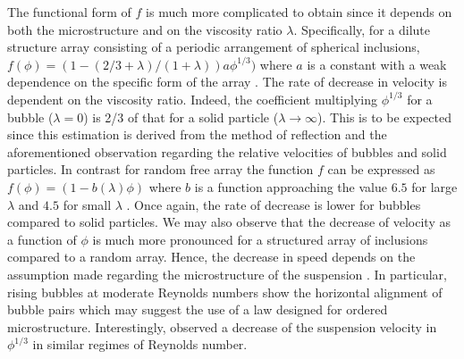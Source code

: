 The functional form of $f$ is much more complicated to obtain since it depends on both the microstructure and on the viscosity ratio $\lambda$. 
Specifically, for a dilute structure array consisting of a periodic arrangement of spherical inclusions, $f(\phi) =(1 - (2/3+\lambda)/(1+\lambda))a\phi^{1/3})$ where $a$ is a constant with a weak dependence on the specific form of the array \citep{sangani1987}. 
The rate of decrease in velocity is dependent on the viscosity ratio. 
Indeed, the coefficient multiplying $\phi^{1/3}$ for a bubble ($\lambda=0$) is 2/3 of that for a solid particle ($\lambda \to \infty$). 
This is to be expected since this estimation is derived from the method of reflection and the aforementioned observation regarding the relative velocities of bubbles and solid particles. In contrast for random free array the function $f$ can be expressed as  $f(\phi) = (1-b(\lambda)\phi)$ where $b$ is a function approaching the value $6.5$ for large $\lambda$ and $4.5$ for small $\lambda$ \citep{wacholder1973,haber1981}. 
Once again, the rate of decrease is lower for bubbles compared to solid particles. 
We may also observe that the decrease of velocity as a function of $\phi$ is much more pronounced for a structured array of inclusions compared to a random array. 
Hence, the decrease in speed depends on the assumption made regarding the microstructure of the suspension \citep{davis1985}. In particular, rising bubbles at moderate Reynolds numbers show the horizontal alignment of bubble pairs \citep{bunner2002dynamics,yin2006} which may suggest the use of a law designed for ordered microstructure. 
Interestingly, \citet{loisy2017} observed a decrease of the suspension velocity in $\phi^{1/3}$ in similar regimes of Reynolds number. 


